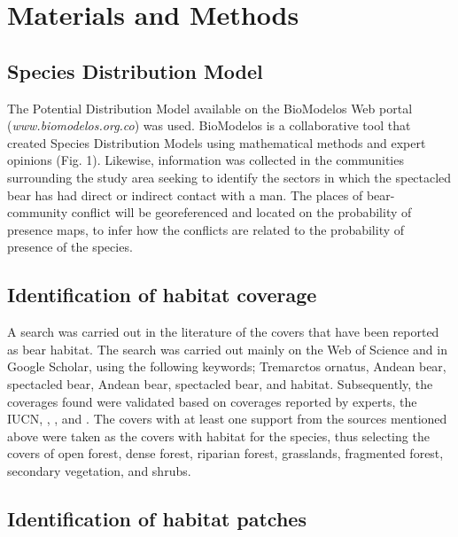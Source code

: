 \documentclass[preprint, 3p,
authoryear]{elsarticle} %
\begin{document}
\hypertarget{materials-and-methods}{%
\section{Materials and Methods}\label{materials-and-methods}}

\hypertarget{species-distribution-model}{%
\subsection{Species Distribution
Model}\label{species-distribution-model}}

The Potential Distribution Model available on the BioModelos Web portal
(\emph{www.biomodelos.org.co}) was used. BioModelos is a collaborative
tool that created Species Distribution Models using mathematical methods
and expert opinions \citep{Velasquez-Tibata2019Biomodelos} (Fig. 1).
Likewise, information was collected in the communities surrounding the
study area seeking to identify the sectors in which the spectacled bear
has had direct or indirect contact with a man. The places of
bear-community conflict will be georeferenced and located on the
probability of presence maps, to infer how the conflicts are related to
the probability of presence of the species.

\hypertarget{identification-of-habitat-coverage}{%
\subsection{Identification of habitat
coverage}\label{identification-of-habitat-coverage}}

A search was carried out in the literature of the covers that have been
reported as bear habitat. The search was carried out mainly on the Web
of Science and in Google Scholar, using the following keywords;
Tremarctos ornatus, Andean bear, spectacled bear, Andean bear,
spectacled bear, and habitat. Subsequently, the coverages found were
validated based on coverages reported by experts, the IUCN,
\citet{Nowak1999Walker}, \citet{Hunt1998Ursidaea}, and
\citet{Garshelis2009Family}. The covers with at least one support from
the sources mentioned above were taken as the covers with habitat for
the species, thus selecting the covers of open forest, dense forest,
riparian forest, grasslands, fragmented forest, secondary vegetation,
and shrubs.

\hypertarget{identification-of-habitat-patches}{%
\subsection{Identification of habitat
patches}\label{identification-of-habitat-patches}}
\end{document}
